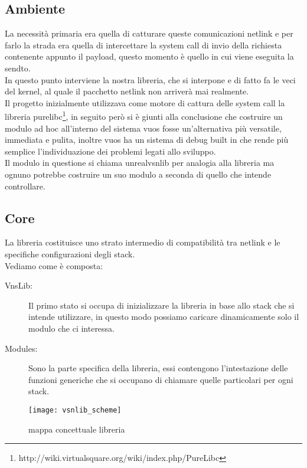 \subsection{Ambiente}
La necessit\`a primaria era quella di catturare queste comunicazioni netlink e per farlo la strada era quella di intercettare la system call di invio della richiesta contenente appunto il payload, questo momento \`e quello in cui viene eseguita la sendto.\\
In questo punto interviene la nostra libreria, che si interpone e di fatto fa le veci del kernel, al quale il pacchetto netlink non arriver\`a mai realmente.\\
Il progetto inizialmente utilizzava come motore di cattura delle system call la libreria purelibc\footnote{http://wiki.virtualsquare.org/wiki/index.php/PureLibc}, in seguito per\`o si \`e giunti alla conclusione che costruire un modulo ad hoc all'interno del sistema vuos fosse un'alternativa pi\`u versatile, immediata e pulita, inoltre vuos ha un sistema di debug built in che rende pi\`u semplice l'individuazione dei problemi legati allo sviluppo.\\
Il modulo in questione si chiama unrealvsnlib per analogia alla libreria ma ognuno potrebbe costruire un suo modulo a seconda di quello che intende controllare.\\

\subsection{Core}
La libreria costituisce uno strato  intermedio di compatibilit\`a tra netlink e le specifiche configurazioni degli stack.\\
Vediamo come \`e composta:
\begin{description}                     %
  \item[VnsLib:] Il primo stato si occupa di inizializzare la libreria in base allo stack che si intende utilizzare, in questo modo possiamo caricare dinamicamente solo il modulo che ci interessa.
  \item[Modules:] Sono la parte specifica della libreria, essi contengono l'intestazione delle funzioni generiche che si occupano di chiamare quelle particolari per ogni stack.
\end{description}
\begin{figure}[h]                       %
\begin{center}                          %
\texttt{[image: vsnlib\_scheme]}%
%
\caption[mappa concettuale libreria]{mappa concettuale libreria}\label{fig:map}
\end{center}
\end{figure}
